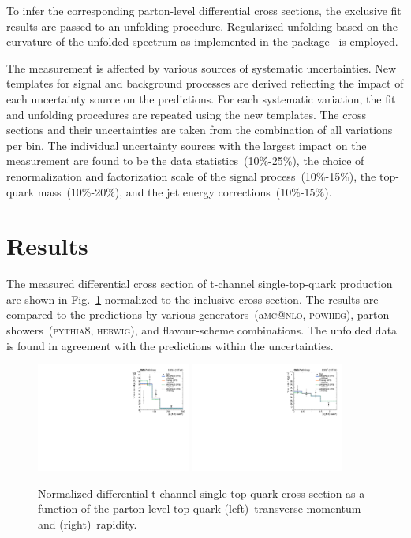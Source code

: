 \documentclass[12pt]{article}
\begin{document}
To infer the corresponding parton-level differential cross sections, the exclusive fit results are passed to an unfolding procedure. Regularized unfolding based on the curvature of the unfolded spectrum as implemented in the \tunfold package~\cite{tunfold} is employed. 

The measurement is affected by various sources of systematic uncertainties. New templates for signal and background processes are derived reflecting the impact of each uncertainty source on the predictions. For each systematic variation, the fit and unfolding procedures are repeated using the new templates. The cross sections and their uncertainties are taken from the combination of all variations per bin. The individual uncertainty sources with the largest impact on the measurement are found to be the data statistics~(10\%-25\%), the choice of renormalization and factorization scale of the signal process~(10\%-15\%), the top-quark mass~(10\%-20\%), and the jet energy corrections~(10\%-15\%).

\section{Results}

The measured differential cross section of t-channel single-top-quark production are shown in Fig.~\ref{fig:result} normalized to the inclusive cross section. The results are compared to the predictions by various generators~(a\textsc{mc@nlo}, \textsc{powheg}), parton showers~(\textsc{pythia}8, \textsc{herwig}), and flavour-scheme combinations. The unfolded data is found in agreement with the predictions within the uncertainties.

\begin{figure}[th]
\begin{center}
\includegraphics[width=0.45\textwidth]{figures/result/unfolded_top_pt.pdf}\hspace{0.05\textwidth}
\includegraphics[width=0.45\textwidth]{figures/result/unfolded_top_y.pdf}
\end{center}

\caption{\label{fig:result}Normalized differential t-channel single-top-quark cross section as a function of the parton-level top quark (left)~transverse momentum and (right)~rapidity.}
\end{figure}
\end{document}
